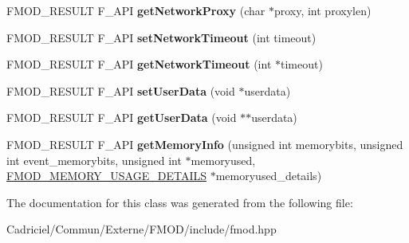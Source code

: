 \begin{DoxyCompactItemize}
\item 
\hypertarget{class_f_m_o_d_1_1_system_a6346a910caaff928a7498f2bfeaf8a69}{F\-M\-O\-D\-\_\-\-R\-E\-S\-U\-L\-T F\-\_\-\-A\-P\-I {\bfseries get\-Network\-Proxy} (char $\ast$proxy, int proxylen)}\label{class_f_m_o_d_1_1_system_a6346a910caaff928a7498f2bfeaf8a69}

\item 
\hypertarget{class_f_m_o_d_1_1_system_aad7cb557e4992666cfc304dfbac6d04e}{F\-M\-O\-D\-\_\-\-R\-E\-S\-U\-L\-T F\-\_\-\-A\-P\-I {\bfseries set\-Network\-Timeout} (int timeout)}\label{class_f_m_o_d_1_1_system_aad7cb557e4992666cfc304dfbac6d04e}

\item 
\hypertarget{class_f_m_o_d_1_1_system_aaabd940cb1f8768ae35bf68782d72ab6}{F\-M\-O\-D\-\_\-\-R\-E\-S\-U\-L\-T F\-\_\-\-A\-P\-I {\bfseries get\-Network\-Timeout} (int $\ast$timeout)}\label{class_f_m_o_d_1_1_system_aaabd940cb1f8768ae35bf68782d72ab6}

\item 
\hypertarget{class_f_m_o_d_1_1_system_ab2f36a02a4badbc4fc4727f37f62b7c3}{F\-M\-O\-D\-\_\-\-R\-E\-S\-U\-L\-T F\-\_\-\-A\-P\-I {\bfseries set\-User\-Data} (void $\ast$userdata)}\label{class_f_m_o_d_1_1_system_ab2f36a02a4badbc4fc4727f37f62b7c3}

\item 
\hypertarget{class_f_m_o_d_1_1_system_a04c439bfbbfa385ce819b29b26584fc5}{F\-M\-O\-D\-\_\-\-R\-E\-S\-U\-L\-T F\-\_\-\-A\-P\-I {\bfseries get\-User\-Data} (void $\ast$$\ast$userdata)}\label{class_f_m_o_d_1_1_system_a04c439bfbbfa385ce819b29b26584fc5}

\item 
\hypertarget{class_f_m_o_d_1_1_system_a248a17e258aa12ccc32c85c7a5a4f64c}{F\-M\-O\-D\-\_\-\-R\-E\-S\-U\-L\-T F\-\_\-\-A\-P\-I {\bfseries get\-Memory\-Info} (unsigned int memorybits, unsigned int event\-\_\-memorybits, unsigned int $\ast$memoryused, \hyperlink{struct_f_m_o_d___m_e_m_o_r_y___u_s_a_g_e___d_e_t_a_i_l_s}{F\-M\-O\-D\-\_\-\-M\-E\-M\-O\-R\-Y\-\_\-\-U\-S\-A\-G\-E\-\_\-\-D\-E\-T\-A\-I\-L\-S} $\ast$memoryused\-\_\-details)}\label{class_f_m_o_d_1_1_system_a248a17e258aa12ccc32c85c7a5a4f64c}

\end{DoxyCompactItemize}


The documentation for this class was generated from the following file\-:\begin{DoxyCompactItemize}
\item 
Cadriciel/\-Commun/\-Externe/\-F\-M\-O\-D/include/fmod.\-hpp\end{DoxyCompactItemize}
